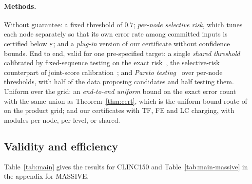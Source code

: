 \paragraph{Methods.} Without guarantee: a fixed threshold of 0.7; \emph{per-node selective
risk}, which tunes each node separately so that its own error rate among committed inputs is
certified below $\eps$; and a \emph{plug-in} version of our certificate without confidence
bounds. End to end, valid for one pre-specified target: a single \emph{shared threshold}
calibrated by fixed-sequence testing on the exact risk~\citep{angelopoulos2021ltt}, the
selective-risk counterpart of joint-score calibration~\citep{ren2023knowno,kotte2026pasc}; and
\emph{Pareto testing}~\citep{laufer2022pareto} over per-node thresholds, with half of the
data proposing candidates and half testing them. Uniform over the grid: an \emph{end-to-end
uniform} bound on the exact error count with the same union as Theorem~\ref{thm:cert}, which
is the uniform-bound route of \citet[\S2.5]{angelopoulos2021ltt} on the product grid; and
our certificates with TF, FE and LC charging, with modules per node, per level, or shared.

\subsection{Validity and efficiency}\label{sec:exp-main}

\begin{table}[t]
\centering\footnotesize
\setlength{\tabcolsep}{3.5pt}

\caption{CLINC150, $n=4{,}000$, $\delta=0.1$, \Trials\ calibration draws. \emph{viol.}:
percentage of draws with population risk above $\eps$ (bold: above $\delta$ for a method
that claims a guarantee); \emph{risk}, \emph{review}: mean population risk and human review
rate in percent. ``fixed'': valid for the single target it was run for; ``uniform'': valid
for all thresholds on the grid at once.}\label{tab:main}
\end{table}

Table~\ref{tab:main} gives the results for CLINC150 and Table~\ref{tab:main-massive} in the
appendix for MASSIVE.

